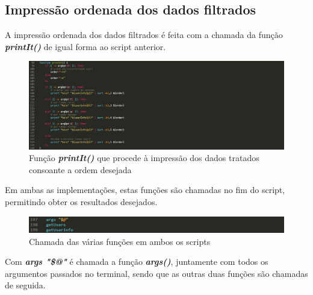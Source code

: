 \documentclass[10pt,portuguese]{article}
\begin{document}
\subsection{Impressão ordenada dos dados filtrados}
\par A impressão ordenada dos dados filtrados é feita com a chamada da função \textbf{\textit{printIt()}} de igual forma ao script anterior.
\begin{figure}[!h]
    \centering
    \includegraphics[width=\textwidth]{comparestats/printit_c.png}
    \caption{Função \textbf{\textit{printIt()}} que procede à impressão dos dados tratados consoante a ordem desejada}
\end{figure}
\newpage
Em ambas as implementações, estas funções são chamadas no fim do script, permitindo obter os resultados desejados.
\begin{figure}[!h]
    \centering
    \includegraphics[width=\textwidth]{function_call.png}
    \caption{Chamada das várias funções em ambos os scripts}
\end{figure}
\newline
\par Com \textbf{\textit{args "\$@"}} é chamada a função \textbf{\textit{args()}}, juntamente com todos os argumentos passados no terminal, sendo que as outras duas funções são chamadas de seguida.
\clearpage
\end{document}
